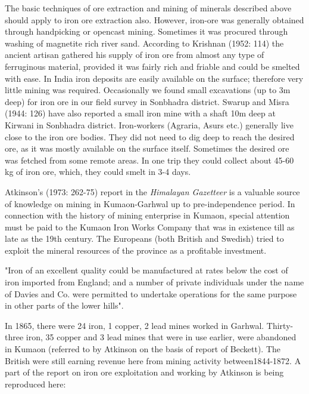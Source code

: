 The basic techniques of ore extraction and mining of minerals described above should apply to iron ore extraction also. However, iron-ore was generally obtained through handpicking or opencast mining. Sometimes it was procured through washing of magnetite rich river sand. According to Krishnan (1952: 114) the ancient artisan gathered his supply of iron ore from almost any type of ferruginous material, provided it was fairly rich and friable and could be smelted with ease. In India iron deposits are easily available on the surface; therefore very little mining was required. Occasionally we found small excavations (up to 3m deep) for iron ore in our field survey in Sonbhadra district. Swarup and Misra (1944: 126) have also reported a small iron mine with a shaft 10m deep at Kirwani in Sonbhadra district. Iron-workers (Agraria, Asurs etc.) generally live close to the iron ore bodies. They did not need to dig deep to reach the desired ore, as it was mostly available on the surface itself. Sometimes the desired ore was fetched from some remote areas. In one trip they could collect about 45-60 kg of iron ore, which, they could smelt in 3-4 days.

Atkinson's (1973: 262-75) report in the \textit{Himalayan Gazetteer }is a valuable source of knowledge on mining in Kumaon-Garhwal up to pre-independence period. In connection with the history of mining enterprise in Kumaon, special attention must be paid to the Kumaon Iron Works Company that was in existence till as late as the 19th century. The Europeans (both British and Swedish) tried to exploit the mineral resources of the province as a profitable investment.

\begin{myquote}
"Iron of an excellent quality could be manufactured at rates below the cost of iron imported from England; and a number of private individuals under the name of Davies and Co. were permitted to undertake operations for the same purpose in other parts of the lower hills".
\end{myquote}

In 1865, there were 24 iron, 1 copper, 2 lead mines worked in Garhwal. Thirty-three iron, 35 copper and 3 lead mines that were in use earlier, were abandoned in Kumaon (referred to by Atkinson on the basis of report of Beckett). The British were still earning revenue here from mining activity between1844-1872. A part of the report on iron ore exploitation and working by Atkinson is being reproduced here:

